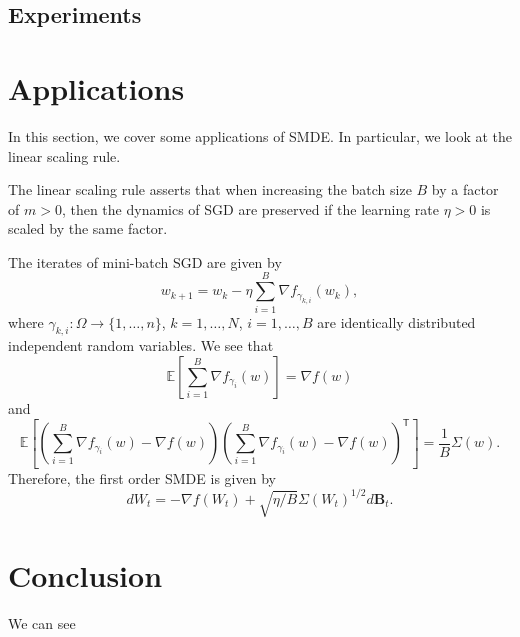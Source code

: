 \documentclass[12pt]{article}
\theoremstyle{definition}
\numberwithin{equation}{section}
\newcommand{\R}{\mathbb{R}}
\newcommand{\T}{\mathsf{T}}
\newcommand{\ev}[1]{\mathbb{E}\left[{#1}\right]}
\DeclareMathOperator{\Tr}{Tr}
\begin{document}
\subsection{Experiments}
\section{Applications}
\label{sec:applications}
In this section, we cover some applications of SMDE. In particular, we look at the linear scaling rule.

The linear scaling rule \cite{goyalAccurateLargeMinibatch2018, krizhevskyOneWeirdTrick2014} asserts that when increasing the batch size $B$ by a factor of $m > 0$, then the dynamics of SGD are preserved if the learning rate $\eta > 0$ is scaled by the same factor.

The iterates of mini-batch SGD are given by
\begin{equation*}
  w_{k+1} = w_k - \eta \sum_{i=1}^B \nabla f_{\gamma_{k, i}}(w_k),
\end{equation*}
where $\gamma_{k,i} : \Omega \rightarrow \{1,\dots,n\}$, $k = 1,\dots,N$, $i =1, \dots, B$ are identically distributed independent random variables.
We see that
\begin{equation*}
  \ev{\sum_{i=1}^B \nabla f_{\gamma_i}(w)} = \nabla f(w)
\end{equation*}
and 
\begin{equation*}
  \ev{\left(\sum_{i=1}^B \nabla f_{\gamma_i}(w) - \nabla f(w)\right)\left(\sum_{i=1}^B \nabla f_{\gamma_i}(w) - \nabla f(w)\right)^\T} = \frac{1}{B} \Sigma(w).
\end{equation*}
Therefore, the first order SMDE is given by
\begin{equation*}
  dW_t = -\nabla f(W_t) + \sqrt{\eta/B}\Sigma(W_t)^{1/2}d\mathbf{B}_t.
\end{equation*}
\section{Conclusion}
We can see 


\printbibliography
\end{document}
